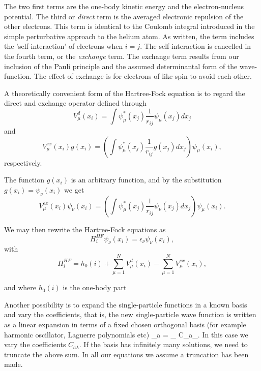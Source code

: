 The two first terms are the one-body kinetic energy and the
electron-nucleus potential. The third or
\emph{direct} term is the averaged electronic repulsion of the other
electrons. This term is identical to the Coulomb integral introduced in
the simple perturbative approach to the helium atom. As written, the
term includes the 'self-interaction' of 
electrons when $i=j$. The self-interaction is cancelled in the fourth
term, or the \emph{exchange} term. The exchange term results from our
inclusion of the Pauli principle and the assumed determinantal form of
the wave-function. The effect of exchange is for electrons of
like-spin to avoid each other.

  A theoretically convenient form of the
Hartree-Fock equation is to regard the direct and exchange operator
defined through 
\begin{equation*}
  V_{\mu}^{d}(x_i) = \int \psi_{\mu}^*(x_j) 
  \frac{1}{r_{ij}}\psi_{\mu}(x_j) dx_j
\end{equation*}
and
\begin{equation*}
  V_{\mu}^{ex}(x_i) g(x_i) 
  = \left(\int \psi_{\mu}^*(x_j) 
  \frac{1}{r_{ij}}g(x_j) dx_j
  \right)\psi_{\mu}(x_i),
\end{equation*}
respectively. 

The function $g(x_i)$ is an arbitrary function,
and by the substitution $g(x_i) = \psi_{\nu}(x_i)$
we get
\begin{equation*}
  V_{\mu}^{ex}(x_i) \psi_{\nu}(x_i) 
  = \left(\int \psi_{\mu}^*(x_j) 
  \frac{1}{r_{ij}}\psi_{\nu}(x_j)
  dx_j\right)\psi_{\mu}(x_i).
\end{equation*}

We may then rewrite the Hartree-Fock equations as
\[
  H_i^{HF} \psi_{\nu}(x_i) = \epsilon_{\nu}\psi_{\nu}(x_i),
\]
with
\[
  H_i^{HF}= h_0(i) + \sum_{\mu=1}^NV_{\mu}^{d}(x_i) -
  \sum_{\mu=1}^NV_{\mu}^{ex}(x_i),
\]

and where $h_0(i)$ is the one-body part

Another possibility is to expand the single-particle functions in a known basis  and vary the coefficients, 
that is, the new single-particle wave function is written as a linear expansion
in terms of a fixed chosen orthogonal basis (for example harmonic oscillator, Laguerre polynomials etc)
\be
\psi_a  = \sum_{\lambda} C_{a\lambda}\psi_{\lambda}.
\label{eq:newbasis}
\ee
In this case we vary the coefficients $C_{a\lambda}$. If the basis has infinitely many solutions, we need
to truncate the above sum.  In all our equations we assume a truncation has been made.

